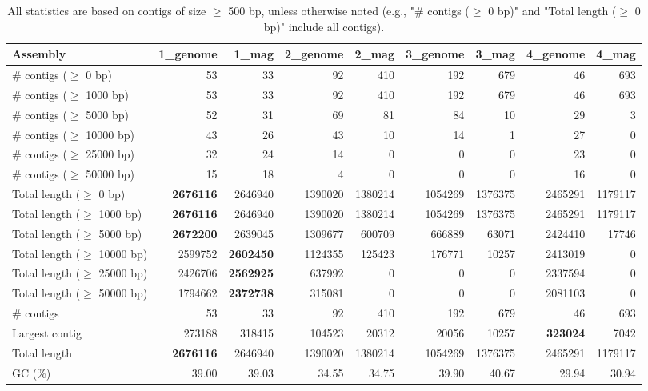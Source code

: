 \documentclass[12pt,a4paper]{article}
\begin{document}
\begin{table}[ht]
\begin{center}
\caption{All statistics are based on contigs of size $\geq$ 500 bp, unless otherwise noted (e.g., "\# contigs ($\geq$ 0 bp)" and "Total length ($\geq$ 0 bp)" include all contigs).}
\begin{tabular}{|l*{8}{|r}|}
\hline
Assembly & 1\_genome & 1\_mag & 2\_genome & 2\_mag & 3\_genome & 3\_mag & 4\_genome & 4\_mag \\ \hline
\# contigs ($\geq$ 0 bp) & 53 & 33 & 92 & 410 & 192 & 679 & 46 & 693 \\ \hline
\# contigs ($\geq$ 1000 bp) & 53 & 33 & 92 & 410 & 192 & 679 & 46 & 693 \\ \hline
\# contigs ($\geq$ 5000 bp) & 52 & 31 & 69 & 81 & 84 & 10 & 29 & 3 \\ \hline
\# contigs ($\geq$ 10000 bp) & 43 & 26 & 43 & 10 & 14 & 1 & 27 & 0 \\ \hline
\# contigs ($\geq$ 25000 bp) & 32 & 24 & 14 & 0 & 0 & 0 & 23 & 0 \\ \hline
\# contigs ($\geq$ 50000 bp) & 15 & 18 & 4 & 0 & 0 & 0 & 16 & 0 \\ \hline
Total length ($\geq$ 0 bp) & {\bf 2676116} & 2646940 & 1390020 & 1380214 & 1054269 & 1376375 & 2465291 & 1179117 \\ \hline
Total length ($\geq$ 1000 bp) & {\bf 2676116} & 2646940 & 1390020 & 1380214 & 1054269 & 1376375 & 2465291 & 1179117 \\ \hline
Total length ($\geq$ 5000 bp) & {\bf 2672200} & 2639045 & 1309677 & 600709 & 666889 & 63071 & 2424410 & 17746 \\ \hline
Total length ($\geq$ 10000 bp) & 2599752 & {\bf 2602450} & 1124355 & 125423 & 176771 & 10257 & 2413019 & 0 \\ \hline
Total length ($\geq$ 25000 bp) & 2426706 & {\bf 2562925} & 637992 & 0 & 0 & 0 & 2337594 & 0 \\ \hline
Total length ($\geq$ 50000 bp) & 1794662 & {\bf 2372738} & 315081 & 0 & 0 & 0 & 2081103 & 0 \\ \hline
\# contigs & 53 & 33 & 92 & 410 & 192 & 679 & 46 & 693 \\ \hline
Largest contig & 273188 & 318415 & 104523 & 20312 & 20056 & 10257 & {\bf 323024} & 7042 \\ \hline
Total length & {\bf 2676116} & 2646940 & 1390020 & 1380214 & 1054269 & 1376375 & 2465291 & 1179117 \\ \hline
GC (\%) & 39.00 & 39.03 & 34.55 & 34.75 & 39.90 & 40.67 & 29.94 & 30.94 \\ \hline

\end{tabular}
\end{center}
\end{table}
\end{document}
